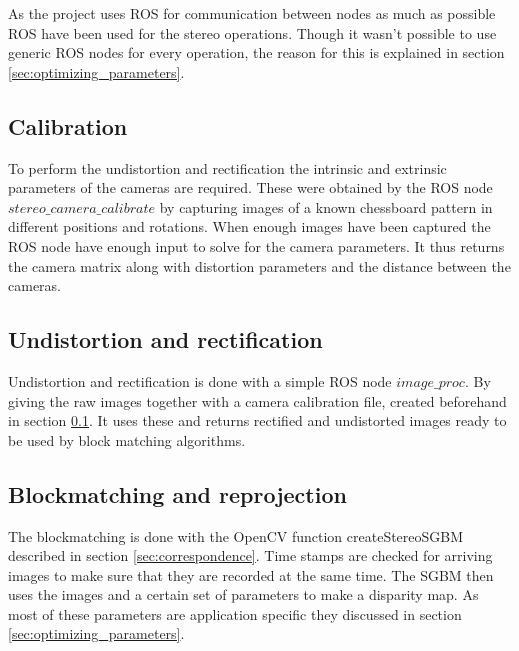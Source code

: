 As the project uses ROS for communication between nodes as much as possible ROS have been used for the stereo operations. Though it wasn't possible to use generic ROS nodes for every operation, the reason for this is explained in section \ref{sec:optimizing_parameters}. 

\subsection{Calibration} \label{sec:calibration}

To perform the undistortion and rectification the intrinsic and extrinsic parameters of the cameras are required. These were obtained by the ROS node $stereo\_camera\_calibrate$ by capturing images of a known chessboard pattern in different positions and rotations. When enough images have been captured the ROS node have enough input to solve for the camera parameters. It thus returns the camera matrix along with distortion parameters and the distance between the cameras.


\subsection{Undistortion and rectification}

Undistortion and rectification is done with a simple ROS node $image\_proc$. By giving the raw images together with a camera calibration file, created beforehand in section \ref{sec:calibration}. It uses these and returns rectified and undistorted images ready to be used by block matching algorithms.

\subsection{Blockmatching and reprojection}

The blockmatching is done with the OpenCV function createStereoSGBM \cite{opencv} described in section \ref{sec:correspondence}. Time stamps are checked for arriving images to make sure that they are recorded at the same time. The SGBM then uses the images and a certain set of parameters to make a disparity map. As most of these parameters are application specific they discussed in section \ref{sec:optimizing_parameters}. 


